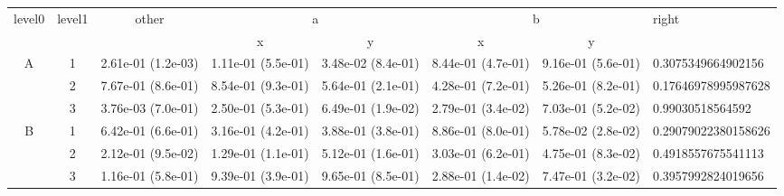 \begin{tabular}{cccccccl}
\toprule
\multirow{2}{*}{level0} & \multirow{2}{*}{level1}& \multirow{2}{*}{other}&\multicolumn{2}{c}{a}&\multicolumn{2}{c}{b}& \multirow{2}{*}{right}\tabularnewline
\cmidrule(lr){4-5}
\cmidrule(lr){6-7}
&&&x&y&x&y\tabularnewline
\midrule
\multirow{3}{*}{A}&1& 2.61e-01 (1.2e-03)& 1.11e-01 (5.5e-01)& 3.48e-02 (8.4e-01)& 8.44e-01 (4.7e-01)& 9.16e-01 (5.6e-01)& 0.3075349664902156\tabularnewline
&2& 7.67e-01 (8.6e-01)& 8.54e-01 (9.3e-01)& 5.64e-01 (2.1e-01)& 4.28e-01 (7.2e-01)& 5.26e-01 (8.2e-01)& 0.17646978995987628\tabularnewline
&3& 3.76e-03 (7.0e-01)& 2.50e-01 (5.3e-01)& 6.49e-01 (1.9e-02)& 2.79e-01 (3.4e-02)& 7.03e-01 (5.2e-02)& 0.99030518564592\tabularnewline
\midrule
\multirow{3}{*}{B}&1& 6.42e-01 (6.6e-01)& 3.16e-01 (4.2e-01)& 3.88e-01 (3.8e-01)& 8.86e-01 (8.0e-01)& 5.78e-02 (2.8e-02)& 0.29079022380158626\tabularnewline
&2& 2.12e-01 (9.5e-02)& 1.29e-01 (1.1e-01)& 5.12e-01 (1.6e-01)& 3.03e-01 (6.2e-01)& 4.75e-01 (8.3e-02)& 0.4918557675541113\tabularnewline
&3& 1.16e-01 (5.8e-01)& 9.39e-01 (3.9e-01)& 9.65e-01 (8.5e-01)& 2.88e-01 (1.4e-02)& 7.47e-01 (3.2e-02)& 0.3957992824019656\tabularnewline
\bottomrule
\end{tabular}
